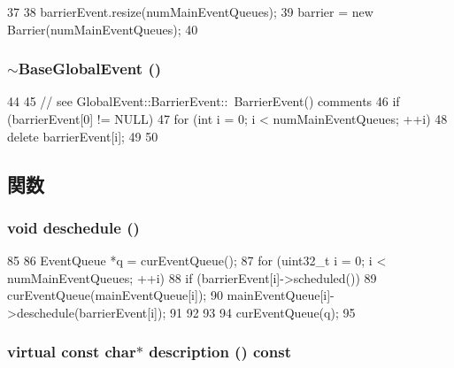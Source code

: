 \begin{DoxyCode}
37 {
38     barrierEvent.resize(numMainEventQueues);
39     barrier = new Barrier(numMainEventQueues);
40 }
\end{DoxyCode}
\hypertarget{classBaseGlobalEvent_aedd3366fd398048fa2ac79e1a5d7b297}{
\subsubsection[{$\sim$BaseGlobalEvent}]{\setlength{\rightskip}{0pt plus 5cm}$\sim${\bf BaseGlobalEvent} ()}}
\label{classBaseGlobalEvent_aedd3366fd398048fa2ac79e1a5d7b297}



\begin{DoxyCode}
44 {
45     // see GlobalEvent::BarrierEvent::~BarrierEvent() comments
46     if (barrierEvent[0] != NULL) {
47         for (int i = 0; i < numMainEventQueues; ++i)
48             delete barrierEvent[i];
49     }
50 }
\end{DoxyCode}


\subsection{関数}
\hypertarget{classBaseGlobalEvent_a210ef248fbe7c0e13a3497711c2a5e0f}{
\subsubsection[{deschedule}]{\setlength{\rightskip}{0pt plus 5cm}void deschedule ()}}
\label{classBaseGlobalEvent_a210ef248fbe7c0e13a3497711c2a5e0f}



\begin{DoxyCode}
85 {
86     EventQueue *q = curEventQueue();
87     for (uint32_t i = 0; i < numMainEventQueues; ++i) {
88         if (barrierEvent[i]->scheduled()) {
89             curEventQueue(mainEventQueue[i]);
90             mainEventQueue[i]->deschedule(barrierEvent[i]);
91         }
92     }
93 
94     curEventQueue(q);
95 }
\end{DoxyCode}
\hypertarget{classBaseGlobalEvent_aaf0ee88413e805ebda5569f5c13d847f}{
\subsubsection[{description}]{\setlength{\rightskip}{0pt plus 5cm}virtual const char$\ast$ description () const}}
\label{classBaseGlobalEvent_aaf0ee88413e805ebda5569f5c13d847f}


